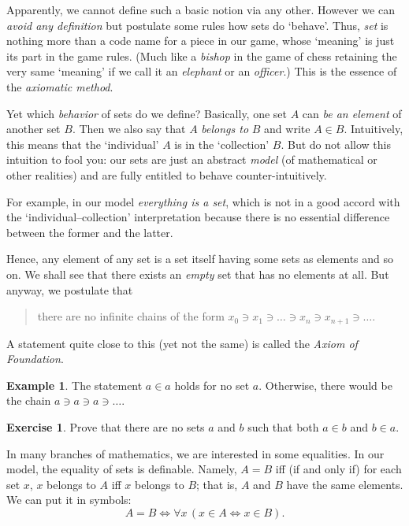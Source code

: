 \documentclass[12pt,notitlepage]{article}
\theoremstyle{plain}
\theoremstyle{definition}
\newtheorem{exc}[thm]{Exercise}
\newtheorem{exm}[thm]{Example}
\theoremstyle{plain}
\newcommand{\1}{\mathbf{1}}
\newcommand{\0}{\mathbf{0}}
\newcommand{\mcomm}[1]{}
\begin{document}
Apparently, we cannot define such a basic notion via any other. However we can \emph{avoid any definition} but postulate some rules how sets do `behave'. Thus, \emph{set} is nothing more than a code name for a piece in our game, whose `meaning' is just its part in the game rules. (Much like a \emph{bishop} in the game of chess retaining the very same `meaning' if we call it an \emph{elephant} or an \emph{officer}.) This is the essence of the \emph{axiomatic method}.

Yet which \emph{behavior} of sets do we define? Basically, one set $A$ can \emph{be an element} of another set $B$. Then we also say that $A$ \emph{belongs to} $B$ and write $A \in B$. Intuitively, this means that the `individual' $A$ is in the `collection' $B$. But do not allow this intuition to fool you: our sets are just an abstract \emph{model} (of mathematical or other realities) and are fully entitled to behave counter-intuitively.

For example, in our model \emph{everything is a set}, which is not in a good accord with the `individual--collection' interpretation because there is no essential difference between the former and the latter.

Hence, any element of any set is a set itself having some sets as elements and so on. We shall see that there exists an \emph{empty} set that has no elements at all. But anyway, we postulate that
\begin{quote}
there are no infinite chains of the form $x_0 \ni x_1 \ni \ldots \ni x_n \ni x_{n+1} \ni \ldots$.
\end{quote}
A statement quite close to this (yet not the same) is called the \emph{Axiom of Foundation}.

\mcomm{Clearly, the standard Axiom of Foundation implies this one. For the other direction, they usually apply the Axiom of (Dependent) Choice.}
\begin{exm}
The statement $a \in a$ holds for no set $a$. Otherwise, there would be the chain $a \ni a \ni a \ni\ldots$.
\end{exm}
\begin{exc}
Prove that there are no sets $a$ and $b$ such that both $a \in b$ and $b \in a$.
\end{exc}

In many branches of mathematics, we are interested in some equalities. In our model, the equality of sets is definable. Namely, $A = B$ iff (if and only if) for each set $x$, $x$ belongs to $A$ iff $x$ belongs to $B$; that is, $A$ and $B$ have the same elements. We can put it in symbols:
$$A = B \iff \forall x\, (x \in A \iff x \in B).$$
\end{document}
